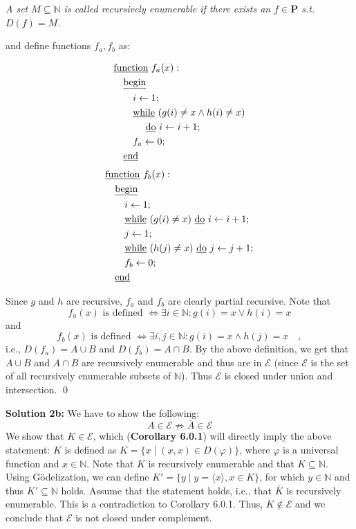 \documentclass [11pt]{article}
\newcommand{\E}{\ensuremath{\mathcal{E}}}
\newcommand{\N}{\ensuremath{\mathbb{N}}}
\begin{document}
\noindent
\emph{A set $M \subseteq \N$ is called recursively enumerable if there exists an $f \in \textbf{P}$ s.t.\ $D(f) = M$.}

\noindent
and define functions $f_a, f_b$ as:
\begin{multicols}{2}
\noindent
\begin{align*}
& \text{\underline{function} } f_a(x): \\
& \quad \text{\underline{begin}} \\
& \quad \quad i \leftarrow 1; \\
& \quad \quad \text{\underline{while} } (g(i) \neq x \land h(i) \neq x) \\
& \quad \quad \quad \text{ \underline{do} } i \leftarrow i +1; \\
& \quad \quad f_a \leftarrow 0; \\
& \quad \text{\underline{end}}
\end{align*}
\begin{align*}
& \text{\underline{function} } f_b(x): \\
& \quad \text{\underline{begin}} \\
& \quad \quad i \leftarrow 1; \\
& \quad \quad \text{\underline{while} } (g(i) \neq x) \text{ \underline{do} } i \leftarrow i + 1; \\
& \quad \quad j \leftarrow 1; \\
& \quad \quad \text{\underline{while} } (h(j) \neq x) \text{ \underline{do} } j \leftarrow j + 1; \\
& \quad \quad f_b \leftarrow 0; \\
& \quad \text{\underline{end}}
\end{align*}
\end{multicols}
\noindent
Since $g$ and $h$ are recursive, $f_a$ and $f_b$ are clearly partial recursive. 
Note that 
$$
f_a(x) \text{ is defined } \iff \exists i \in \N: g(i) = x \lor h(i) = x
$$
and 
$$
f_b(x) \text{ is defined } \iff \exists i,j \in \N: g(i) = x \land h(j) = x \quad ,
$$
i.e., $D(f_a) = A \cup B$ and $D(f_b) = A \cap B$.
By the above definition, we get that $A\cup B$ and $A \cap B$ are recursively enumerable and thus are in $\E$ (since $\E$ is the set of all recursively enumerable subsets of \N). 
Thus $\E$ is closed under union and intersection. \qed

\bigskip
\noindent
\textbf{Solution 2b:}
We have to show the following:
$$
A \in \E \not \Rightarrow \overline{A} \in \E
$$
We show that $K \in \E$, which (\textbf{Corollary 6.0.1}) will directly imply the above statement:
$K$ is defined as $ K = \{x\mid (x,x) \in D(\varphi) \}$, where $\varphi$ is a universal function and $x \in \N$. 
Note that $K$ is recursively enumerable and that $K \subseteq \N$. 
Using G\"odelization, we can define $K' = \{y \mid y = \langle x\rangle, x \in K \}$, for which $y \in \N$ and thus $K'\subseteq \N$ holds.
Assume that the statement holds, i.e., that $\overline{K}$ is recursively enumerable. 
This is a contradiction to Corollary 6.0.1.
Thus, $K \not \in \E$ and we conclude that $\E$ is not closed under complement.
\end{document}
